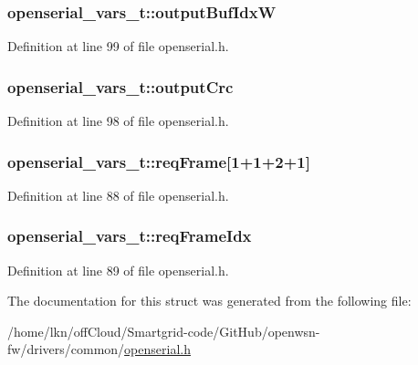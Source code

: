 \subsubsection[{\texorpdfstring{output\+Buf\+IdxW}{outputBufIdxW}}]{ openserial\+\_\+vars\+\_\+t\+::output\+Buf\+IdxW}\hypertarget{structopenserial__vars__t_a1f9a1d728df39d695458bdcb8fd4d0d9}{}\label{structopenserial__vars__t_a1f9a1d728df39d695458bdcb8fd4d0d9}


Definition at line 99 of file openserial.\+h.

\subsubsection[{\texorpdfstring{output\+Crc}{outputCrc}}]{ openserial\+\_\+vars\+\_\+t\+::output\+Crc}\hypertarget{structopenserial__vars__t_accd7c880a97b11c47d8d0c80df9a9a95}{}\label{structopenserial__vars__t_accd7c880a97b11c47d8d0c80df9a9a95}


Definition at line 98 of file openserial.\+h.

\subsubsection[{\texorpdfstring{req\+Frame}{reqFrame}}]{ openserial\+\_\+vars\+\_\+t\+::req\+Frame\mbox{[}1+1+2+1\mbox{]}}\hypertarget{structopenserial__vars__t_a7a7e14173525bd203f08e5292b9104c8}{}\label{structopenserial__vars__t_a7a7e14173525bd203f08e5292b9104c8}


Definition at line 88 of file openserial.\+h.

\subsubsection[{\texorpdfstring{req\+Frame\+Idx}{reqFrameIdx}}]{ openserial\+\_\+vars\+\_\+t\+::req\+Frame\+Idx}\hypertarget{structopenserial__vars__t_ae32c72c80c2d713890283c8423a2d91c}{}\label{structopenserial__vars__t_ae32c72c80c2d713890283c8423a2d91c}


Definition at line 89 of file openserial.\+h.



The documentation for this struct was generated from the following file\+:\begin{DoxyCompactItemize}
\item 
/home/lkn/off\+Cloud/\+Smartgrid-\/code/\+Git\+Hub/openwsn-\/fw/drivers/common/\hyperlink{openserial_8h}{openserial.\+h}\end{DoxyCompactItemize}
